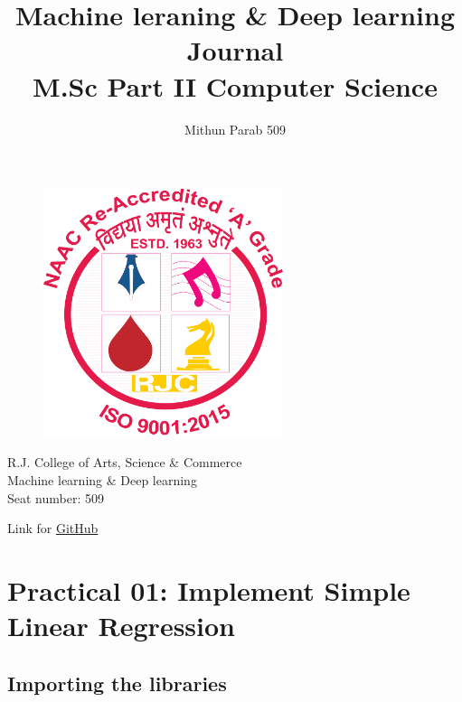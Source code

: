 \documentclass[11pt]{article}
\title{\huge{\textbf{ Machine leraning \& Deep learning Journal}} \\
    \LARGE{M.Sc Part II Computer Science}}
\author{Mithun Parab 509}
\begin{document}
    
\clearpage\maketitle
\thispagestyle{empty}
\begin{center}
    \begin{figure}[h]
        \centering
        \includegraphics[width=7cm]{RJCLG.png}
        \label{fig:logo}
    \end{figure}

    \large{R.J. College of Arts, Science \& Commerce \\
    Machine learning \& Deep learning \\
    Seat number: 509
    }
\end{center}
\newpage

\newpage
\tableofcontents
\begin{center}
    Link for \href{https://github.com/Mithunprb/MSc-Practicals-Journals/tree/main/MSc-Part2/MLDL/Practicals}{GitHub}
\end{center}
\newpage
{} %
    

    
    \section{Practical 01: Implement Simple Linear
Regression}\label{practical-01-implement-simple-linear-regression}

    \subsection{Importing the libraries}\label{importing-the-libraries}
\end{document}
